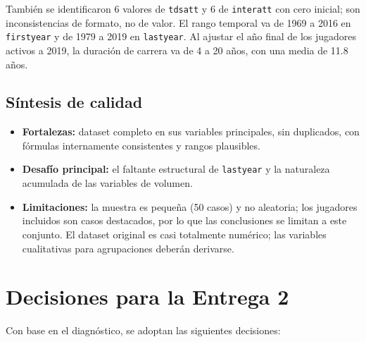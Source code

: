 \documentclass[11pt,a4paper]{article}
\begin{document}
También se identificaron 6 valores de \texttt{tdsatt} y 6 de \texttt{interatt} con cero inicial; son inconsistencias de formato, no de valor. El rango temporal va de 1969 a 2016 en \texttt{firstyear} y de 1979 a 2019 en \texttt{lastyear}. Al ajustar el año final de los jugadores activos a 2019, la duración de carrera va de 4 a 20 años, con una media de 11.8 años.

\subsection{Síntesis de calidad}
\begin{itemize}
  \item \textbf{Fortalezas:} dataset completo en sus variables principales, sin duplicados, con fórmulas internamente consistentes y rangos plausibles.
  \item \textbf{Desafío principal:} el faltante estructural de \texttt{lastyear} y la naturaleza acumulada de las variables de volumen.
  \item \textbf{Limitaciones:} la muestra es pequeña (50 casos) y no aleatoria; los jugadores incluidos son casos destacados, por lo que las conclusiones se limitan a este conjunto. El dataset original es casi totalmente numérico; las variables cualitativas para agrupaciones deberán derivarse.
\end{itemize}

\section{Decisiones para la Entrega 2}
Con base en el diagnóstico, se adoptan las siguientes decisiones:
\end{document}
